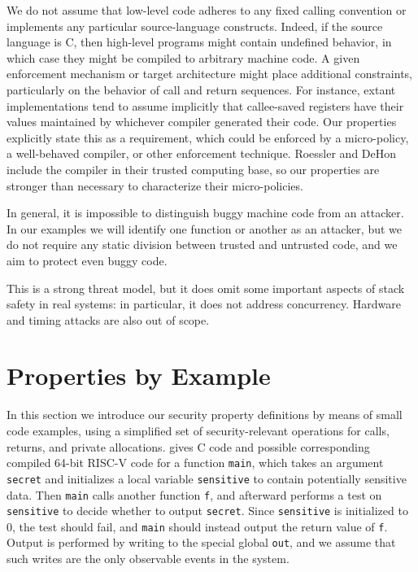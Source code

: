 \documentclass[10pt,conference]{ieeetran}%
\theoremstyle{definition}
\begin{document}
We do not assume that low-level code adheres to any fixed calling
convention or implements any particular source-language constructs.
Indeed, if the source
language is C, then high-level programs might contain undefined
behavior, in which case they might be compiled to arbitrary machine
code. A given enforcement
mechanism or target architecture might place additional constraints, particularly on the behavior of
call and return sequences. For instance, extant implementations tend to assume
implicitly that callee-saved registers have their values maintained by whichever compiler
generated their code. Our properties explicitly state this as a requirement,
which could be enforced by a micro-policy, a well-behaved compiler, or other enforcement technique.
Roessler and DeHon include the compiler in their trusted computing
base, so our properties
are stronger than necessary to characterize their micro-policies.

In general, it is impossible to distinguish buggy machine code from an
attacker.  In our examples we will identify one function or another as
an attacker, but we do not require any static division between trusted
and untrusted code, and we aim to protect even buggy code.

This is a strong threat model, but it does omit some important aspects
of stack safety in real systems: in particular, it does not address
concurrency.  Hardware and timing attacks are also out of scope.
%

\section{Properties by Example}
\label{sec:example}

In this section we introduce our security property definitions by means
of small code examples, using a simplified set of security-relevant operations for
calls, returns, and private allocations.
 gives C code and possible corresponding compiled 64-bit RISC-V code
for a function {\tt main}, which
takes an argument {\tt secret} and initializes a local variable {\tt sensitive} to contain
potentially sensitive data.
Then {\tt main} calls another function {\tt f},
and afterward performs a test on {\tt sensitive} to decide whether
to output {\tt secret}.  Since {\tt sensitive} is initialized to 0,
the test should fail, and {\tt main} should instead output the return value of {\tt f}.
Output is performed by writing to the special global {\tt out},
and we assume that such writes are the only observable events in the system.
\end{document}
